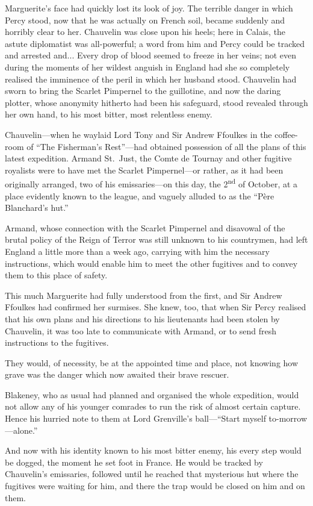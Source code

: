 \documentclass[paper=a5,BCOR=7mm,twoside,DIV=calc,12pt,usegeometry,chapterprefix,endperiod,headings=big]{scrbook}
\begin{document}
Marguerite's face had quickly lost its look of joy. The terrible danger in which Percy stood, now that he was actually on French soil, became suddenly and horribly clear to her. Chauvelin was close upon his heels; here in Calais, the astute diplomatist was all-powerful; a word from him and Percy could be tracked and arrested and... Every drop of blood seemed to freeze in her veins; not even during the moments of her wildest anguish in England had she so completely realised the imminence of the peril in which her husband stood. Chauvelin had sworn to bring the Scarlet Pimpernel to the guillotine, and now the daring plotter, whose anonymity hitherto had been his safeguard, stood revealed through her own hand, to his most bitter, most relentless enemy.

Chauvelin---when he waylaid Lord Tony and Sir Andrew Ffoulkes in the coffee-room of \enquote{The Fisherman's Rest}---had obtained possession of all the plans of this latest expedition. Armand St.~Just, the Comte de Tournay and other fugitive royalists were to have met the Scarlet Pimpernel---or rather, as it had been originally arranged, two of his emissaries---on this day, the 2\textsuperscript{nd} of October, at a place evidently known to the league, and vaguely alluded to as the \enquote{Père Blanchard's hut.}

Armand, whose connection with the Scarlet Pimpernel and disavowal of the brutal policy of the Reign of Terror was still unknown to his countrymen, had left England a little more than a week ago, carrying with him the necessary instructions, which would enable him to meet the other fugitives and to convey them to this place of safety.

This much Marguerite had fully understood from the first, and Sir Andrew Ffoulkes had confirmed her surmises. She knew, too, that when Sir Percy realised that his own plans and his directions to his lieutenants had been stolen by Chauvelin, it was too late to communicate with Armand, or to send fresh instructions to the fugitives.

They would, of necessity, be at the appointed time and place, not knowing how grave was the danger which now awaited their brave rescuer.

Blakeney, who as usual had planned and organised the whole expedition, would not allow any of his younger comrades to run the risk of almost certain capture. Hence his hurried note to them at Lord Grenville's ball---\enquote{Start myself to-morrow---alone.}

And now with his identity known to his most bitter enemy, his every step would be dogged, the moment he set foot in France. He would be tracked by Chauvelin's emissaries, followed until he reached that mysterious hut where the fugitives were waiting for him, and there the trap would be closed on him and on them.
\end{document}

